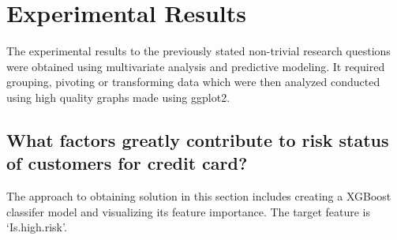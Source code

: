 \documentclass{article}\usepackage[]{graphicx}\usepackage[]{xcolor}
\begin{document}
\newpage
\section{Experimental Results}

The experimental results to the previously stated non-trivial research questions were obtained using multivariate analysis and predictive modeling. It required grouping, pivoting or transforming data which were then analyzed conducted using high quality graphs made using ggplot2.\\

\subsection{What factors greatly contribute to risk status of customers for credit card?}

The approach to obtaining solution in this section includes creating a XGBoost classifer model and visualizing its feature importance. The target feature is `Is.high.risk'.\\
\end{document}
